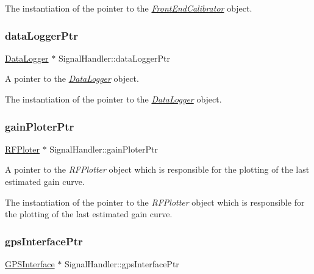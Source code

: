 The instantiation of the pointer to the {\itshape \hyperlink{classFrontEndCalibrator}{Front\+End\+Calibrator}} object. \mbox{\label{classSignalHandler_a114e600bdc2ad95efbc2991c97f3732c}} 
\subsubsection{\texorpdfstring{data\+Logger\+Ptr}{dataLoggerPtr}}
{\footnotesize\ttfamily \hyperlink{classDataLogger}{Data\+Logger} $\ast$ Signal\+Handler\+::data\+Logger\+Ptr\hspace{0.3cm}{\ttfamily [static]}}



A pointer to the {\itshape \hyperlink{classDataLogger}{Data\+Logger}} object. 

The instantiation of the pointer to the {\itshape \hyperlink{classDataLogger}{Data\+Logger}} object. \mbox{\label{classSignalHandler_a1c6637986751faafe7cb5ffd58400f77}} 
\subsubsection{\texorpdfstring{gain\+Ploter\+Ptr}{gainPloterPtr}}
{\footnotesize\ttfamily \hyperlink{classRFPloter}{R\+F\+Ploter} $\ast$ Signal\+Handler\+::gain\+Ploter\+Ptr\hspace{0.3cm}{\ttfamily [static]}}



A pointer to the {\itshape R\+F\+Plotter} object which is responsible for the plotting of the last estimated gain curve. 

The instantiation of the pointer to the {\itshape R\+F\+Plotter} object which is responsible for the plotting of the last estimated gain curve. \mbox{\label{classSignalHandler_ac6bc3decceefdff9d3e5c15e4125fe08}} 
\subsubsection{\texorpdfstring{gps\+Interface\+Ptr}{gpsInterfacePtr}}
{\footnotesize\ttfamily \hyperlink{classGPSInterface}{G\+P\+S\+Interface} $\ast$ Signal\+Handler\+::gps\+Interface\+Ptr\hspace{0.3cm}{\ttfamily [static]}}



